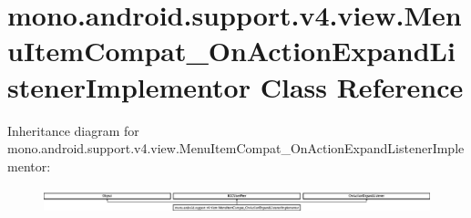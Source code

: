 \hypertarget{classmono_1_1android_1_1support_1_1v4_1_1view_1_1_menu_item_compat___on_action_expand_listener_implementor}{}\section{mono.\+android.\+support.\+v4.\+view.\+Menu\+Item\+Compat\+\_\+\+On\+Action\+Expand\+Listener\+Implementor Class Reference}
\label{classmono_1_1android_1_1support_1_1v4_1_1view_1_1_menu_item_compat___on_action_expand_listener_implementor}
Inheritance diagram for mono.\+android.\+support.\+v4.\+view.\+Menu\+Item\+Compat\+\_\+\+On\+Action\+Expand\+Listener\+Implementor\+:\begin{figure}[H]
\begin{center}
\leavevmode
\includegraphics[height=0.739274cm]{classmono_1_1android_1_1support_1_1v4_1_1view_1_1_menu_item_compat___on_action_expand_listener_implementor}
\end{center}
\end{figure}
